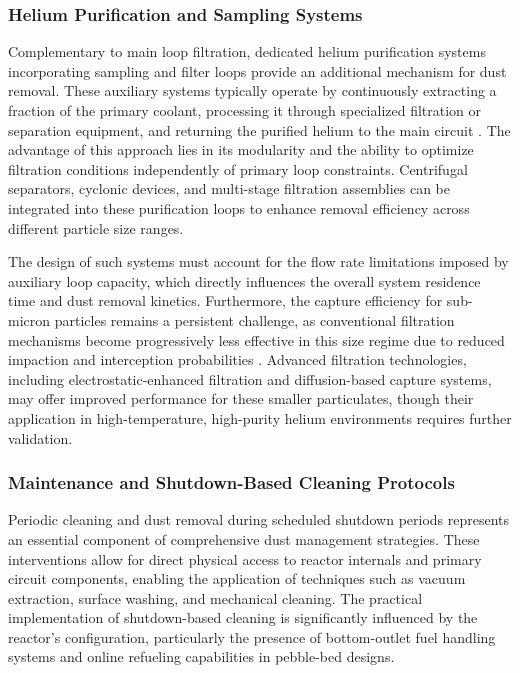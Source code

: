 \documentclass[12pt,a4paper]{article}
\begin{document}
\subsubsection{Helium Purification and Sampling Systems}

Complementary to main loop filtration, dedicated helium purification systems incorporating sampling and filter loops provide an additional mechanism for dust removal. These auxiliary systems typically operate by continuously extracting a fraction of the primary coolant, processing it through specialized filtration or separation equipment, and returning the purified helium to the main circuit \cite{Moormann2018Caution}. The advantage of this approach lies in its modularity and the ability to optimize filtration conditions independently of primary loop constraints. Centrifugal separators, cyclonic devices, and multi-stage filtration assemblies can be integrated into these purification loops to enhance removal efficiency across different particle size ranges.

The design of such systems must account for the flow rate limitations imposed by auxiliary loop capacity, which directly influences the overall system residence time and dust removal kinetics. Furthermore, the capture efficiency for sub-micron particles remains a persistent challenge, as conventional filtration mechanisms become progressively less effective in this size regime due to reduced impaction and interception probabilities \cite{Xie2017HTR10Dust}. Advanced filtration technologies, including electrostatic-enhanced filtration and diffusion-based capture systems, may offer improved performance for these smaller particulates, though their application in high-temperature, high-purity helium environments requires further validation.

\subsubsection{Maintenance and Shutdown-Based Cleaning Protocols}

Periodic cleaning and dust removal during scheduled shutdown periods represents an essential component of comprehensive dust management strategies. These interventions allow for direct physical access to reactor internals and primary circuit components, enabling the application of techniques such as vacuum extraction, surface washing, and mechanical cleaning. The practical implementation of shutdown-based cleaning is significantly influenced by the reactor's configuration, particularly the presence of bottom-outlet fuel handling systems and online refueling capabilities in pebble-bed designs.
\end{document}

